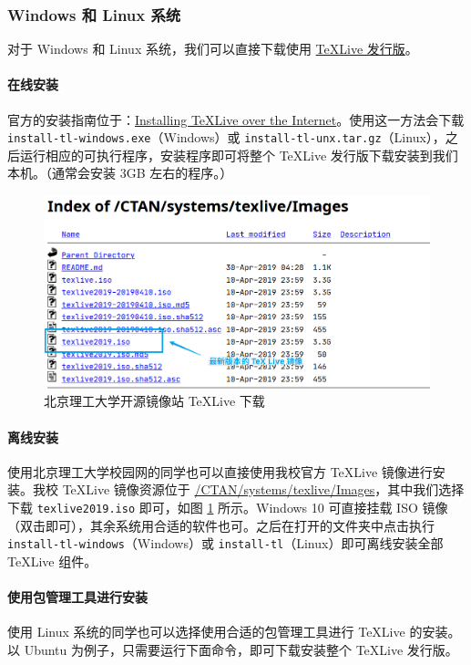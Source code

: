 \subsubsection{Windows 和 Linux 系统}
对于 Windows 和 Linux 系统，我们可以直接下载使用 \href{https://www.tug.org/texlive/}{\TeX Live 发行版}。

\paragraph{在线安装} 官方的安装指南位于：\href{https://www.tug.org/texlive/acquire-netinstall.html}{Installing \TeX Live over the Internet}。使用这一方法会下载 \texttt{install-tl-windows.exe}（Windows）或 \texttt{install-tl-unx.tar.gz}（Linux），之后运行相应的可执行程序，安装程序即可将整个 \TeX Live 发行版下载安装到我们本机。（通常会安装 3GB 左右的程序。）

\begin{figure}[H]
  \centering
  \includegraphics[width=\textwidth]{images/bit_mirror_texlive.png}
  \caption{北京理工大学开源镜像站 \TeX Live 下载}
  \label{mirrorbit}
\end{figure}

\paragraph{离线安装} 使用北京理工大学校园网的同学也可以直接使用我校官方 \TeX Live 镜像进行安装。我校 \TeX Live 镜像资源位于 \href{https://mirrors.bit.edu.cn/CTAN/systems/texlive/Images}{/CTAN/systems/texlive/Images}，其中我们选择下载 \texttt{texlive2019.iso} 即可，如图 \ref{mirrorbit} 所示。Windows 10 可直接挂载 ISO 镜像（双击即可），其余系统用合适的软件也可。之后在打开的文件夹中点击执行 \texttt{install-tl-windows}（Windows）或 \texttt{install-tl}（Linux）即可离线安装全部 \TeX Live 组件。

\paragraph{使用包管理工具进行安装} 使用 Linux 系统的同学也可以选择使用合适的包管理工具进行 \TeX Live 的安装。以 Ubuntu 为例子，只需要运行下面命令，即可下载安装整个 \TeX Live 发行版。

